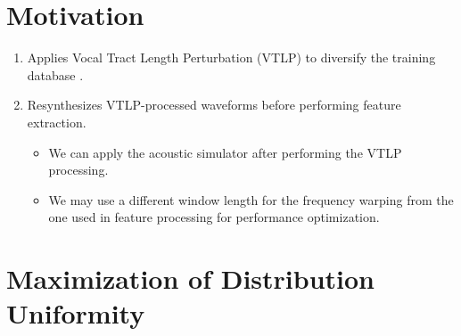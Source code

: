 \documentclass[a0,portrait]{a0poster}
\begin{document}
\begin{multicols}{2} %



\large

\color{Navy} %


\color{SaddleBrown} %

\section{Motivation}

\begin{enumerate}
  \item Applies Vocal Tract Length Perturbation (VTLP) to diversify the
    training database \cite{n_jaitly_icml_workshop_2013_00}.
  \item Resynthesizes VTLP-processed waveforms before performing feature extraction.
    \begin{itemize}
        \item We can apply the acoustic simulator after performing the VTLP
          processing.
        \item We may use a different window length for the frequency warping from
          the one used in feature processing for performance optimization.
    \end{itemize}
\end{enumerate}


\color{DarkSlateGray} %
  \section{Maximization of Distribution Uniformity}


\end{multicols}
\end{document}
